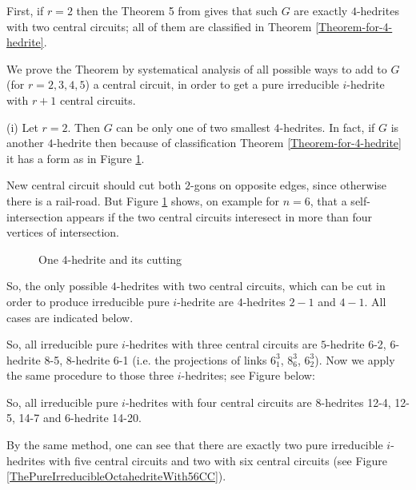 \documentclass[12pt]{article}
\begin{document}
First, if $r=2$ then the Theorem 5 from \cite{DSt} gives that such $G$ are 
exactly $4$-hedrites with two central circuits; all of them are classified 
in Theorem \ref{Theorem-for-4-hedrite}.

We prove the Theorem by systematical analysis of all possible ways to add 
to $G$ (for $r=2,3,4,5$) a central circuit, in order to get a pure 
irreducible $i$-hedrite with $r+1$ central circuits. 


(i) Let $r=2$. Then $G$ can be only one of two smallest $4$-hedrites. In 
fact, if $G$ is another $4$-hedrite then because of classification Theorem 
\ref{Theorem-for-4-hedrite} it has a form as in Figure \ref{Cutting4hedrite}.

New central circuit should cut both $2$-gons on opposite edges, since otherwise there is a rail-road. But Figure \ref{Cutting4hedrite} shows, on example for $n=6$, that a self-intersection appears if the two central circuits interesect in more than four vertices of intersection.


\begin{figure}
\centering
\epsfxsize=40mm
\caption{One $4$-hedrite and its cutting}
\label{Cutting4hedrite}
\end{figure}



So, the only possible $4$-hedrites with two central circuits, which can
be cut in order to produce irreducible pure $i$-hedrite
are $4$-hedrites $2-1$ and $4-1$. 
All cases are indicated below. 

\begin{center}
\epsfxsize=120mm
\end{center}

So, all irreducible pure $i$-hedrites with three central circuits are $5$-hedrite 6-2, $6$-hedrite 8-5, $8$-hedrite 6-1 (i.e. the projections of links $6^3_1$, $8^3_6$, $6^3_2$).
Now we apply the same procedure to those three $i$-hedrites; see Figure below:

\begin{center}
\epsfxsize=120mm
\end{center}

So, all irreducible pure $i$-hedrites with four central circuits are $8$-hedrites 12-4, 12-5, 14-7 and $6$-hedrite 14-20.

By the same method, one can see that there are exactly two pure irreducible $i$-hedrites with five central circuits and two with six central circuits (see Figure \ref{ThePureIrreducibleOctahedriteWith56CC}).
\end{document}
